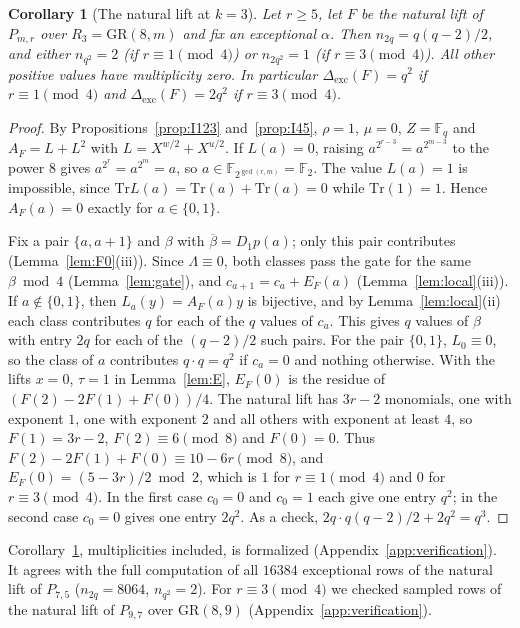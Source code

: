 \documentclass[11pt]{article}
\newtheorem{corollary}[theorem]{Corollary}
\theoremstyle{definition}
\theoremstyle{remark}
\newcommand{\F}{\mathbb{F}}
\newcommand{\GR}{\mathrm{GR}}
\newcommand{\Tr}{\mathrm{Tr}}
\newcommand{\ol}[1]{\overline{#1}}
\newcommand{\Dexc}{\Delta_{\mathrm{exc}}}
\begin{document}
\begin{corollary}[The natural lift at $k=3$]\label{cor:natural}
Let $r\ge5$, let $F$ be the natural lift of $P_{m,r}$ over $R_3=\GR(8,m)$ and fix an exceptional $\alpha$. Then
$n_{2q}=q(q-2)/2$, and either $n_{q^2}=2$ (if $r\equiv1\pmod4$) or $n_{2q^2}=1$ (if $r\equiv3\pmod4$). All other
positive values have multiplicity zero. In particular $\Dexc(F)=q^2$ if $r\equiv1\pmod4$ and $\Dexc(F)=2q^2$ if
$r\equiv3\pmod4$.
\end{corollary}
\begin{proof}
By Propositions~\ref{prop:I123} and~\ref{prop:I45}, $\rho=1$, $\mu=0$, $Z=\F_q$ and $A_F=L+L^2$ with
$L=X^{w/2}+X^{u/2}$. If $L(a)=0$, raising $a^{2^{r-3}}=a^{2^{m-3}}$ to the power $8$ gives $a^{2^r}=a^{2^m}=a$, so
$a\in\F_{2^{\gcd(r,m)}}=\F_2$. The value $L(a)=1$ is impossible, since $\Tr L(a)=\Tr(a)+\Tr(a)=0$ while $\Tr(1)=1$. Hence
$A_F(a)=0$ exactly for $a\in\{0,1\}$.

Fix a pair $\{a,a+1\}$ and $\beta$ with $\ol\beta=D_1p(a)$; only this pair contributes (Lemma~\ref{lem:F0}(iii)).
Since $\Lambda\equiv0$, both classes pass the gate for the same $\beta\bmod4$ (Lemma~\ref{lem:gate}), and
$c_{a+1}=c_a+E_F(a)$ (Lemma~\ref{lem:local}(iii)). If $a\notin\{0,1\}$, then $L_a(y)=A_F(a)y$ is bijective, and by
Lemma~\ref{lem:local}(ii) each class contributes $q$ for each of the $q$ values of $c_a$. This gives $q$ values of
$\beta$ with entry $2q$ for each of the $(q-2)/2$ such pairs. For the pair $\{0,1\}$, $L_0\equiv0$, so the class of
$a$ contributes $q\cdot q=q^2$ if $c_a=0$ and nothing otherwise. With the lifts $x=0$, $\tau=1$ in Lemma~\ref{lem:E},
$E_F(0)$ is the residue of $(F(2)-2F(1)+F(0))/4$. The natural lift has $3r-2$ monomials, one with exponent $1$, one
with exponent $2$ and all others with exponent at least $4$, so $F(1)=3r-2$, $F(2)\equiv6\pmod8$ and $F(0)=0$. Thus
$F(2)-2F(1)+F(0)\equiv10-6r\pmod8$, and $E_F(0)=(5-3r)/2\bmod2$, which is $1$ for $r\equiv1\pmod4$ and $0$ for
$r\equiv3\pmod4$. In the first case $c_0=0$ and $c_0=1$ each give one entry $q^2$; in the second case $c_0=0$ gives one
entry $2q^2$. As a check, $2q\cdot q(q-2)/2+2q^2=q^3$.
\end{proof}

Corollary~\ref{cor:natural}, multiplicities included, is formalized (Appendix~\ref{app:verification}). It agrees
with the full computation of all $16384$ exceptional rows of the natural lift of $P_{7,5}$
($n_{2q}=8064$, $n_{q^2}=2$). For $r\equiv3\pmod4$ we checked sampled rows of the natural lift of $P_{9,7}$ over
$\GR(8,9)$ (Appendix~\ref{app:verification}).
\end{document}
